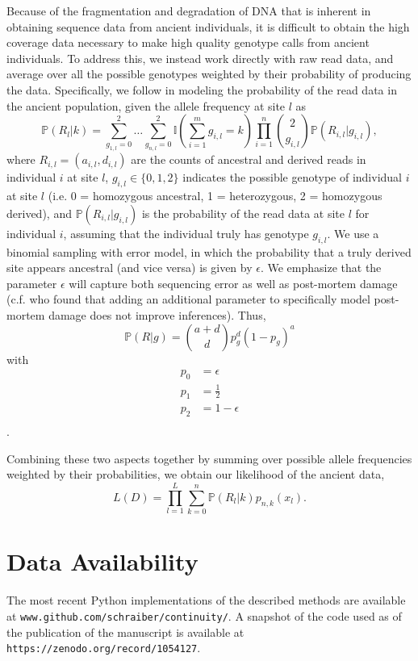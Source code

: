 \documentclass[11pt, oneside]{article}   	%
\begin{document}
Because of the fragmentation and degradation of DNA that is inherent in obtaining sequence data from ancient individuals, it is difficult to obtain the high coverage data necessary to make high quality genotype calls from ancient individuals. To address this, we instead work directly with raw read data, and average over all the possible genotypes weighted by their probability of producing the data. Specifically, we follow \citet{nielsen2012snp} in modeling the probability of the read data in the ancient population, given the allele frequency at site $l$ as
\[
\mathbb{P}(R_l | k) = \sum_{g_{1,l} = 0}^2 \ldots \sum_{g_{n,l} = 0}^2 \mathbb{I}\left(\sum_{i=1}^m g_{i,l} = k\right) \prod_{i=1}^n \binom{2}{g_{i,l}}\mathbb{P}(R_{i,l} | g_{i,l}),
\]
where $R_{i,l}= (a_{i,l}, d_{i,l})$ are the counts of ancestral and derived reads in individual $i$ at site $l$, $g_{i,l} \in \{0, 1, 2\}$ indicates the possible genotype of individual $i$ at site $l$ (i.e. 0 = homozygous ancestral, 1 = heterozygous, 2 = homozygous derived), and $\mathbb{P}(R_{i,l} | g_{i,l})$ is the probability of the read data at site $l$ for individual $i$, assuming that the individual truly has genotype $g_{i,l}$. We use a binomial sampling with error model, in which the probability that a truly derived site appears ancestral (and vice versa) is given by $\epsilon$. We emphasize that the parameter $\epsilon$ will capture both sequencing error as well as post-mortem damage (c.f. \citet{racimo2016joint} who found that adding an additional parameter to specifically model post-mortem damage does not improve inferences). Thus,
\[
\mathbb{P}(R | g) = \binom{a + d}{d} p_{g}^d(1-p_{g})^a
\]
with
\begin{align*}
p_0 &= \epsilon\\
p_1 &= \frac{1}{2}\\
p_2 &= 1-\epsilon\\
\end{align*}.

Combining these two aspects together by summing over possible allele frequencies weighted by their probabilities, we obtain our likelihood of the ancient data,
\begin{equation}
L(D) = \prod_{l=1}^L \sum_{k = 0}^n \mathbb{P}(R_l | k) p_{n,k}(x_l).
\label{likelihood}
\end{equation}

\section{Data Availability}
The most recent Python implementations of the described methods are available at \texttt{www.github.com/schraiber/continuity/}. A snapshot of the code used as of the publication of the manuscript is available at \texttt{https://zenodo.org/record/1054127}.
\end{document}
